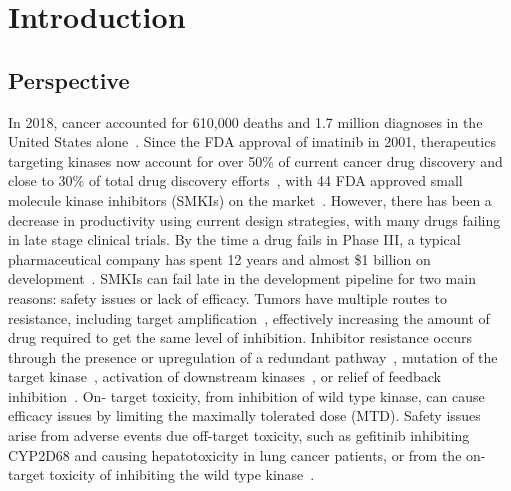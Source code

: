 \documentclass[phd,tocprelim]{cornell}
\begin{document}
\contentspage
\tablelistpage
\figurelistpage


\normalspacing \setcounter{page}{1} 
\pagestyle{cornell} \addtolength{\parskip}{0.5\baselineskip}

\chapter{Introduction}

\section{Perspective}
In 2018, cancer accounted for 610,000 deaths and 1.7 million diagnoses in the United States alone~\citep{Siegel:2018cq}. Since the FDA approval of imatinib in 2001, therapeutics targeting kinases now account for over 50\% of current cancer drug discovery and close to 30\% of total drug discovery efforts~\citep{Cohen:2010fs}, with 44 FDA approved small molecule kinase inhibitors (SMKIs) on the market~\citep{fda-approved-kinase-inhibitors}. However, there has been a decrease in productivity using current design strategies, with many drugs failing in late stage clinical trials. By the time a drug fails in Phase III, a typical pharmaceutical company has spent 12 years and almost \$1 billion on development~\citep{Paul:2010ff}. SMKIs can fail late in the development pipeline for two main reasons: safety issues or lack of efficacy. Tumors have multiple routes to resistance, including target amplification~\citep{SanchezVega:2018jg,Bose:2013gl}, effectively increasing the amount of drug required to get the same level of inhibition. Inhibitor resistance occurs through the presence or upregulation of a redundant pathway~\citep{Prahallad:2012iw,Engelman:2007ka}, mutation of the target kinase~\citep{Pao:2005dp,Drilon:2017gb}, activation of downstream kinases~\citep{Knight:Nat.Rev.Cancer:2010}, or relief of feedback inhibition~\citep{Chandarlapaty:CancerCell:2011}. On- target toxicity, from inhibition of wild type kinase, can cause efficacy issues by limiting the maximally tolerated dose (MTD). Safety issues arise from adverse events due off-target toxicity, such as gefitinib inhibiting CYP2D68 and causing hepatotoxicity in lung cancer patients, or from the on-target toxicity of inhibiting the wild type kinase~\citep{Rudmann2013-hi,Liu2014-yi}. 
\end{document}
